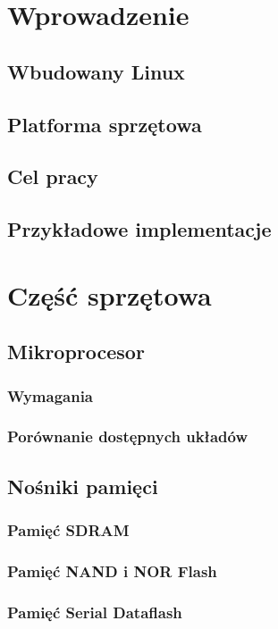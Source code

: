 \documentclass[a4paper]{article}
\begin{document}
	\tableofcontents
	
	\newpage
	\section{Wprowadzenie}
		\subsection{Wbudowany Linux}
		\subsection{Platforma sprzętowa}
		\subsection{Cel pracy}
		\subsection{Przykładowe implementacje}

	\section{Część sprzętowa}
		\subsection{Mikroprocesor}
			\subsubsection{Wymagania}
			\subsubsection{Porównanie dostępnych układów}
		\subsection{Nośniki pamięci}
			\subsubsection{Pamięć SDRAM}			
			\subsubsection{Pamięć NAND i NOR Flash}
			\subsubsection{Pamięć Serial Dataflash}
\end{document}
